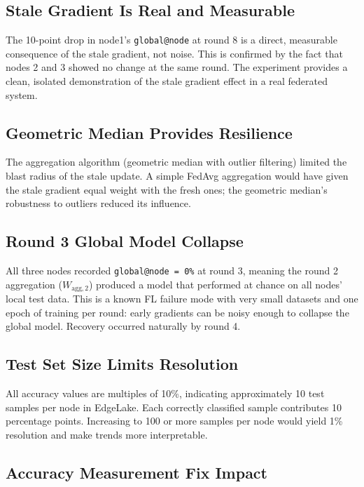 \documentclass[11pt]{article}
\begin{document}
\subsection{Stale Gradient Is Real and Measurable}

The 10-point drop in node1's \texttt{global@node} at round 8 is a direct, measurable consequence of the stale gradient, not noise. This is confirmed by the fact that nodes 2 and 3 showed no change at the same round. The experiment provides a clean, isolated demonstration of the stale gradient effect in a real federated system.

\subsection{Geometric Median Provides Resilience}

The aggregation algorithm (geometric median with outlier filtering) limited the blast radius of the stale update. A simple FedAvg aggregation would have given the stale gradient equal weight with the fresh ones; the geometric median's robustness to outliers reduced its influence.

\subsection{Round 3 Global Model Collapse}

All three nodes recorded \texttt{global@node = 0\%} at round 3, meaning the round 2 aggregation ($W_{\text{agg},2}$) produced a model that performed at chance on all nodes' local test data. This is a known FL failure mode with very small datasets and one epoch of training per round: early gradients can be noisy enough to collapse the global model. Recovery occurred naturally by round 4.

\subsection{Test Set Size Limits Resolution}

All accuracy values are multiples of 10\%, indicating approximately 10 test samples per node in EdgeLake. Each correctly classified sample contributes 10 percentage points. Increasing to 100 or more samples per node would yield 1\% resolution and make trends more interpretable.

\subsection{Accuracy Measurement Fix Impact}
\end{document}
